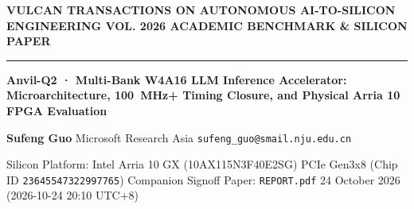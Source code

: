 \documentclass[11pt,a4paper]{article}
\begin{document}
{\scriptsize\sffamily\textcolor{vulcan}{\textbf{VULCAN TRANSACTIONS ON AUTONOMOUS AI-TO-SILICON ENGINEERING \hfill VOL. 2026 \textperiodcentered{} ACADEMIC BENCHMARK \& SILICON PAPER}}\par}

\vspace{1pt}\textcolor{vulcan}{\rule{\textwidth}{1.2pt}}\vspace{3pt}

\begin{center}

{\sffamily\LARGE\bfseries Anvil-Q2 · Multi-Bank W4A16 LLM Inference Accelerator: Microarchitecture, 100~MHz+ Timing Closure, and Physical Arria 10 FPGA Evaluation\par}\vspace{3pt}

{\small\sffamily\textbf{Sufeng Guo} \textperiodcentered{} Microsoft Research Asia \textperiodcentered{} \texttt{sufeng\_guo@smail.nju.edu.cn}\par}\vspace{1pt}

{\scriptsize\sffamily\textcolor{black!75}{Silicon Platform: Intel Arria 10 GX (\allowbreak{}10AX115N3F40E2SG)\allowbreak{} PCIe Gen3x8 (Chip ID \texttt{23645547322997765}) \textperiodcentered{} Companion Signoff Paper: \texttt{REPORT.pdf} \textperiodcentered{} 24 October 2026 (\allowbreak{}2026-10-24 20:10 UTC+\allowbreak{}8)\allowbreak{}}\par}

\end{center}\vspace{2pt}
\end{document}
